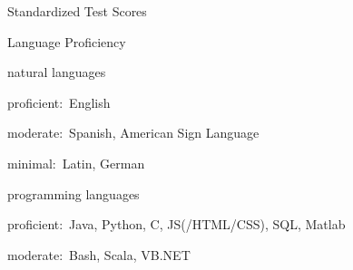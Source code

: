 \documentclass{resume}
\newcommand{\AP}[0]{\DepartmentTitle{AP Coursework}{}}
\begin{document}
\begin{rSection}{Standardized Test Scores}



  \end{rSection}





  \newpage

  \begin{rSection}{Language Proficiency}

  \begin{rSubSection}{\normalfont natural languages}{}{}{}
  \item proficient:~English
  \item moderate:~Spanish, American Sign Language
  \item minimal:~Latin, German
  \end{rSubSection}

  \begin{rSubSection}{\normalfont programming languages}{}{}{}
  \item proficient:~Java, Python, C, JS(/HTML/CSS), SQL, Matlab
  \item moderate:~Bash, Scala, VB.NET
  \end{rSubSection}

  \end{rSection}
\end{document}
